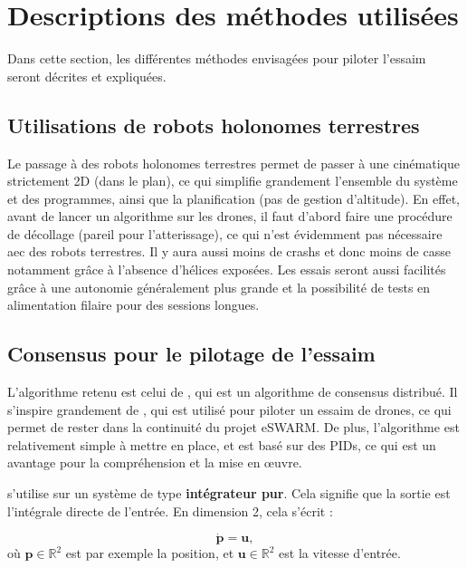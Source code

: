 \chapter{Descriptions des méthodes utilisées}

\noindent Dans cette section, les différentes méthodes envisagées pour piloter l'essaim seront décrites et expliquées.


\section{Utilisations de robots holonomes terrestres}

Le passage à des robots holonomes terrestres permet de passer à une cinématique strictement 2D (dans le plan), ce qui simplifie grandement l'ensemble du système et des programmes, ainsi que la planification (pas de gestion d’altitude). En effet, avant de lancer un algorithme sur les drones, il faut d'abord faire une procédure de décollage (pareil pour l'atterissage), ce qui n'est évidemment pas nécessaire aec des robots terrestres. Il y aura aussi moins de crashs et donc moins de casse notamment grâce à l’absence d’hélices exposées. Les essais seront aussi facilités grâce à une autonomie généralement plus grande et la possibilité de tests en alimentation filaire pour des sessions longues.

\section{Consensus pour le pilotage de l'essaim}

% 

L'algorithme retenu est celui de \cite{koung_consensus-based_2020}, qui est un algorithme de consensus distribué. Il s'inspire grandement de \cite{saif_distributed_2019}, qui est utilisé pour piloter un essaim de drones, ce qui permet de rester dans la continuité du projet eSWARM. De plus, l'algorithme est relativement simple à mettre en place, et est basé sur des PIDs, ce qui est un avantage pour la compréhension et la mise en œuvre. 

\cite{koung_consensus-based_2020} s'utilise sur un système de type \textbf{int\'egrateur pur}. Cela signifie que la sortie est l'int\'egrale directe de l'entrée. En dimension 2, cela s'écrit :

\begin{equation}
\dot{\mathbf{p}} = \mathbf{u},
\end{equation}
où $\mathbf{p} \in \mathbb{R}^2$ est par exemple la position, et $\mathbf{u} \in \mathbb{R}^2$ est la vitesse d'entrée. 


